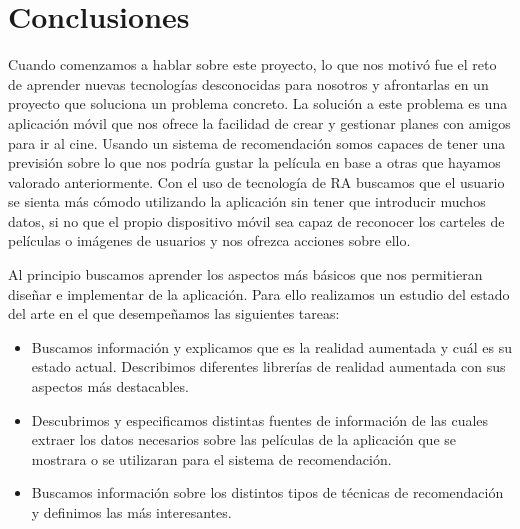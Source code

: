 
\cleardoublepage


\chapter{Conclusiones}
\label{makereference5}
Cuando comenzamos a hablar sobre este proyecto, lo que nos motivó fue el
 reto de aprender nuevas tecnologías desconocidas para nosotros y afrontarlas
 en un proyecto que soluciona un problema concreto. La solución a este problema
 es una aplicación móvil que nos ofrece la facilidad de crear y gestionar
 planes con amigos para ir al cine. Usando un sistema de recomendación somos
 capaces de tener una previsión sobre lo que nos podría gustar la película en
 base a otras que hayamos valorado anteriormente.
 Con el uso de tecnología de RA buscamos que el usuario se sienta más cómodo
 utilizando la aplicación sin tener que introducir muchos datos, si no que el propio
 dispositivo móvil sea capaz de reconocer los carteles de películas o imágenes
 de usuarios y nos ofrezca acciones sobre ello.

Al principio buscamos aprender los aspectos más básicos que nos permitieran
 diseñar e implementar de la aplicación. Para ello realizamos un estudio
 del estado del arte en el que desempeñamos las siguientes tareas:
\begin{itemize}  
    \item Buscamos información y explicamos que es la realidad aumentada y cuál es su
        estado actual. Describimos diferentes librerías de realidad aumentada con sus
        aspectos más destacables.
    \item Descubrimos y especificamos distintas fuentes de información de las cuales extraer
        los datos necesarios sobre las películas de la aplicación que se mostrara o se utilizaran
        para el sistema de recomendación.
    \item Buscamos información sobre los distintos tipos de técnicas de recomendación y
        definimos las más interesantes.
\end{itemize}


